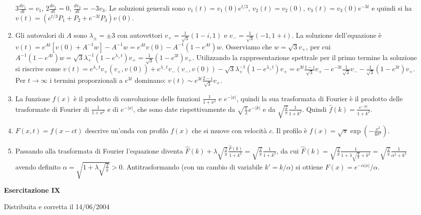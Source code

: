 \documentclass[a4paper,10pt]{article}
\begin{document}
\begin{enumerate}
$3 \frac{dv_1}{dt} = v_1$,
$2 \frac{dv_2}{dt} = 0$,
$\frac{dv_3}{dt} = -3 v_3$. Le soluzioni generali sono $v_1(t) = v_1(0) e^{t/3}$, $v_2(t)=v_2(0)$,
$v_3(t) = v_3(0) e^{-3 t}$ e quindi si ha $v(t)= (e^{t/3} P_1+P_2+e^{-3t}P_3)v(0)$.
\item Gli autovalori di $A$ sono $\lambda_\pm = \pm 3$ con autovettori
$v_+=\frac{1}{\sqrt{3}} (1-i,1)$ e $v_-=\frac{1}{\sqrt{3}} (-1,1+i)$.
La soluzione dell'equazione \`e $v(t) = 
e^{At} [ v(0) + A^{-1}  w] -A^{-1}w= e^{At} v(0) - A^{-1} (1-e^{At}) w$.
Osserviamo che $w=\sqrt{3}v_+$, per cui
$A^{-1} (1-e^{At}) w = \sqrt{3} \lambda_+^{-1} (1-e^{\lambda_+ t }) v_+ =
\frac{1}{\sqrt{3}} (1-e^{3t}) v_+$.
Utilizzando la rappresentazione spettrale per il primo termine 
la soluzione si riscrive come
$v(t) = e^{\lambda_+ t} v_+ (v_+,v(0)) + e^{\lambda_- t} v_- (v_-,v(0))-
\sqrt{3} \lambda_+^{-1} (1-e^{\lambda_+ t }) v_+ =
 e^{3 t} \frac{1-i}{\sqrt{3}} v_+  - e^{-3t} \frac{1}{\sqrt{3}} v_-
 - \frac{1}{\sqrt{3}} (1-e^{3 t }) v_+$.
Per $t \rightarrow \infty$ i termini proporzionali a $e^{3t}$ dominano: 
$v(t) \sim   e^{3t} \frac{2-i}{\sqrt{3}} v_+$.
\item La funzione $f(x)$ \`e il prodotto di convoluzione delle funzioni $\frac{1}{1+x^2}$ e  $e^{-|x|}$, quindi la sua trasformata di Fourier  \`e il prodotto delle
trasformate di Fourier di $\frac{1}{1+x^2}$ e di $e^{-|x|}$, che sono
date rispettivamente da $\sqrt{\frac{\pi}{2}} e^{-|k|}$ e da
$\sqrt{\frac{2}{\pi}} \frac{1}{1+k^2}$. Quindi
$\hat{f}(k) = \frac{e^{-|k|}}{1+k^2}$.
\item $F(x,t)=f(x-ct)$ descrive un'onda con profilo $f(x)$ che si muove con velocit\`a $c$. Il profilo \`e $f(x)=\sqrt{\pi} \exp(-\frac{x^2}{4\sigma^2})$. 
\item Passando alla trasformata di Fourier l'equazione diventa
$\hat{F}(k) + \lambda \sqrt{\frac{2}{\pi}} \frac{\hat{F}(k)}{1 + k^2} =
  \sqrt{\frac{2}{\pi}} \frac{1}{1 + k^2}$, da cui
$\hat{F}(k) = \sqrt{\frac{2}{\pi}}
\frac{1}{1+\lambda \sqrt{\frac{2}{\pi}} + k^2} = 
\sqrt{\frac{2}{\pi}} \frac{1}{\alpha^2 + k^2}$ avendo definito
$\alpha = \sqrt{ 1+\lambda \sqrt{\frac{2}{\pi}}}>0$.
Antitrasformando (con un cambio di variabile $k'=k/\alpha$)
 si ottiene $F(x) = e^{-\alpha |x|}/\alpha$.
\end{enumerate}


\newpage

\centerline{\LARGE \bf Esercitazione IX}
\centerline{Distribuita e corretta il  14/06/2004}
\vskip10pt
\end{document}

